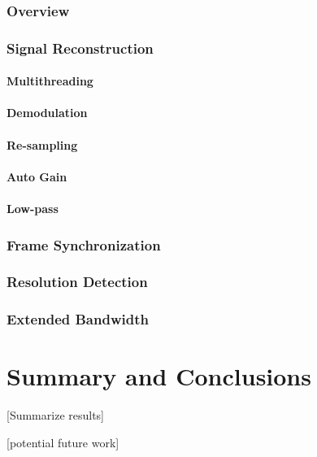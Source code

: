 \documentclass[a4paper,12pt,twoside,openright]{report}
\begin{document}
\subsection{Overview}

\subsection{Signal Reconstruction}

\subsubsection{Multithreading}

\subsubsection{Demodulation}

\subsubsection{Re-sampling}

\subsubsection{Auto Gain}

\subsubsection{Low-pass}

\subsection{Frame Synchronization}

\subsection{Resolution Detection}

\subsection{Extended Bandwidth}


\chapter{Summary and Conclusions} 

[Summarize results]

[potential future work]

\appendix
\singlespacing

 
 
\end{document}
